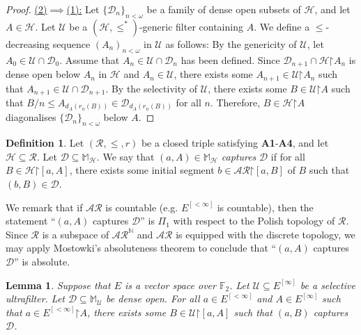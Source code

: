 \documentclass[11pt,reqno]{amsart}
\theoremstyle{plain}
\numberwithin{equation}{section}
\newtheorem{lemma}[theorem]{Lemma}
\theoremstyle{definition}
\newtheorem{definition}[theorem]{Definition}
\newcommand{\N}{\mathbb{N}}
\newcommand{\cal}{\mathcal}
\newcommand{\restrictedto}{\mathord{\upharpoonright}}
\newcommand{\U}{\cal{U}}
\renewcommand{\H}{\cal{H}}
\newcommand{\D}{\cal{D}}
\begin{document}
\begin{proof}
    \underline{(2)$\implies$(1):} Let $\{\D_n\}_{n<\omega}$ be a family of dense open subsets of $\H$, and let $A \in \H$. Let $\U$ be a $(\H,\leq^*)$-generic filter containing $A$. We define a $\leq$-decreasing sequence $(A_n)_{n<\omega}$ in $\U$ as follows: By the genericity of $\U$, let $A_0 \in \U \cap \D_0$. Assume that $A_n \in \U \cap \D_n$ has been defined. Since $\D_{n+1} \cap \H\restrictedto A_n$ is dense open below $A_n$ in $\H$ and $A_n \in \U$, there exists some $A_{n+1} \in \U\restrictedto A_n$ such that $A_{n+1} \in \U \cap \D_{n+1}$. By the selectivity of $\U$, there exists some $B \in \U\restrictedto A$ such that $B/n \leq A_{d_A(r_n(B))} \in \D_{d_A(r_n(B))}$ for all $n$. Therefore, $B \in \H\restrictedto A$ diagonalises $\{\D_n\}_{n<\omega}$ below $A$.
\end{proof}

\begin{definition}
\label{def:capture.dense.set}
    Let $(\cal{R},\leq,r)$ be a closed triple satisfying \textbf{A1}-\textbf{A4}, and let $\H \subseteq \cal{R}$. Let $\D \subseteq \mathbb{M}_\H$. We say that $(a,A) \in \mathbb{M}_\H$ \emph{captures} $\D$ if for all $B \in \H\restrictedto[a,A]$, there exists some initial segment $b \in \cal{AR}\restrictedto[a,B]$ of $B$ such that $(b,B) \in \D$.
\end{definition}

We remark that if $\cal{AR}$ is countable (e.g. $E^{[<\infty]}$ is countable), then the statement ``$(a,A)$ captures $\D$'' is $\Pi_1$ with respect to the Polish topology of $\cal{R}$. Since $\cal{R}$ is a subspace of $\cal{AR}^\N$ and $\cal{AR}$ is equipped with the discrete topology, we may apply Mostowki's absoluteness theorem to conclude that ``$(a,A)$ captures $\D$'' is absolute.

\begin{lemma}
\label{lem:capturing.possible}
    Suppose that $E$ is a vector space over $\mathbb{F}_2$. Let $\U \subseteq E^{[\infty]}$ be a selective ultrafilter. Let $\D \subseteq \mathbb{M}_\U$ be dense open. For all $a \in E^{[<\infty]}$ and $A \in E^{[\infty]}$ such that $a \in E^{[<\infty]}\restrictedto A$, there exists some $B \in \U\restrictedto[a,A]$ such that $(a,B)$ captures $\D$.
\end{lemma}
\end{document}
